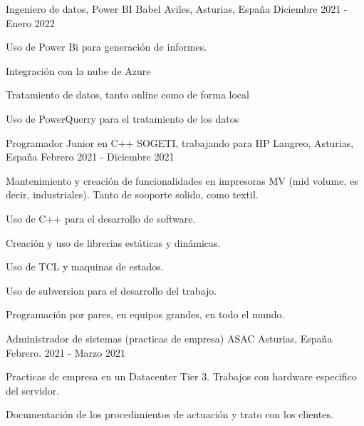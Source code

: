 \begin{cventries}
    \cventry
    {Ingeniero de datos, Power BI} %
    {Babel} %
    {Aviles, Asturias, España} %
    {Diciembre 2021 - Enero 2022} %
    {
        \begin{cvitems} %
            \item {Uso de Power Bi para generación de informes.}
            \item  {Integración con la nube de Azure}
            \item {Tratamiento de datos, tanto online como de forma local}
            \item {Uso de PowerQuerry para el tratamiento de los datos}
        \end{cvitems}
    }

    \cventry
    {Programador Junior en C++} %
    {SOGETI, trabajando para HP} %
    {Langreo, Asturias, España} %
    {Febrero 2021 - Diciembre 2021} %
    {
        \begin{cvitems} %
            \item {Mantenimiento y creación de funcionalidades en impresoras MV (mid volume, es decir, industriales).
                        Tanto de sooporte solido, como textil.}
            \item {Uso de C++ para el desarrollo de software.}
            \item {Creación y uso de librerias estáticas y dinámicas.}
            \item {Uso de TCL y maquinas de estados.}
            \item {Uso de subversion para el desarrollo del trabajo.}
            \item {Programación por pares, en equipos grandes, en todo el mundo.}
        \end{cvitems}
    }

    \cventry
    {Administrador de sistemas (practicas de empresa)} %
    {ASAC} %
    {Asturias, España} %
    {Febrero. 2021 - Marzo 2021} %
    {
        \begin{cvitems} %
            \item {Practicas de empresa en un Datacenter Tier 3. Trabajos con hardware especifico del servidor.}
            \item {Documentación de los procedimientos de actuación y trato con los clientes.}
        \end{cvitems}
    }


\end{cventries}
